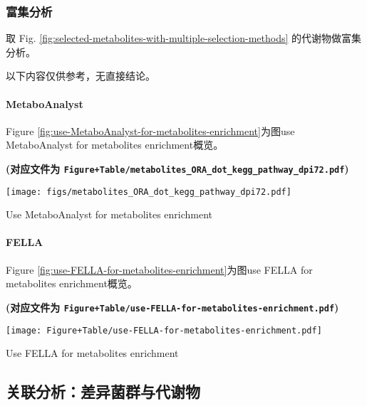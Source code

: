\documentclass[
]{article}
\begin{document}
\hypertarget{ux5bccux96c6ux5206ux6790}{%
\subsubsection{富集分析}\label{ux5bccux96c6ux5206ux6790}}

取 Fig. \ref{fig:selected-metabolites-with-multiple-selection-methods} 的代谢物做富集分析。

以下内容仅供参考，无直接结论。

\hypertarget{metaboanalyst}{%
\paragraph{MetaboAnalyst}\label{metaboanalyst}}

Figure \ref{fig:use-MetaboAnalyst-for-metabolites-enrichment}为图use MetaboAnalyst for metabolites enrichment概览。

\textbf{(对应文件为 \texttt{Figure+Table/metabolites\_ORA\_dot\_kegg\_pathway\_dpi72.pdf})}

\def\@captype{figure}
\begin{center}
\texttt{[image: figs/metabolites\_ORA\_dot\_kegg\_pathway\_dpi72.pdf]}
\caption{Use MetaboAnalyst for metabolites enrichment}\label{fig:use-MetaboAnalyst-for-metabolites-enrichment}
\end{center}

\hypertarget{fella}{%
\paragraph{FELLA}\label{fella}}

Figure \ref{fig:use-FELLA-for-metabolites-enrichment}为图use FELLA for metabolites enrichment概览。

\textbf{(对应文件为 \texttt{Figure+Table/use-FELLA-for-metabolites-enrichment.pdf})}

\def\@captype{figure}
\begin{center}
\texttt{[image: Figure+Table/use-FELLA-for-metabolites-enrichment.pdf]}
\caption{Use FELLA for metabolites enrichment}\label{fig:use-FELLA-for-metabolites-enrichment}
\end{center}

\hypertarget{ux5173ux8054ux5206ux6790ux5deeux5f02ux83ccux7fa4ux4e0eux4ee3ux8c22ux7269}{%
\subsection{关联分析：差异菌群与代谢物}\label{ux5173ux8054ux5206ux6790ux5deeux5f02ux83ccux7fa4ux4e0eux4ee3ux8c22ux7269}}
\end{document}
